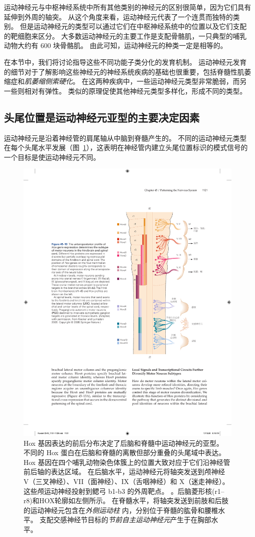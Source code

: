 运动神经元与中枢神经系统中所有其他类别的神经元的区别很简单，因为它们具有延伸到外周的轴突。
从这个角度来看，运动神经元代表了一个连贯而独特的类别。
但是运动神经元的类型可以通过它们在中枢神经系统中的位置以及它们支配的靶细胞来区分。
大多数运动神经元的主要工作是支配骨骼肌，一只典型的哺乳动物大约有 600 块骨骼肌。
由此可知，运动神经元的种类一定是相等的。


在本节中，我们将讨论指导这些不同功能子类分化的发育机制。
运动神经元发育的细节对于了解影响这些神经元的神经系统疾病的基础也很重要，包括脊髓性肌萎缩症和\textit{肌萎缩侧索硬化}。
在这两种疾病中，一些运动神经元类型非常脆弱，而另一些则相对有弹性。
类似的原理促使其他神经元类型多样化，形成不同的类型。



\subsection{头尾位置是运动神经元亚型的主要决定因素}

运动神经元是沿着神经管的肩尾轴从中脑到脊髓产生的。
不同的运动神经元类型在每个头尾水平发展（图~\ref{fig:45_10}），这表明在神经管内建立头尾位置标识的模式信号的一个目标是使运动神经元不同。


\begin{figure}[htbp]
	\centering
	\includegraphics[width=0.71\linewidth]{chap45/fig_45_10}
	\caption{Hox 基因表达的前后分布决定了后脑和脊髓中运动神经元的亚型。
		不同的 Hox 蛋白在后脑和脊髓的离散但部分重叠的头尾域中表达。
		Hox 基因在四个哺乳动物染色体簇上的位置大致对应于它们沿神经管前后轴的表达区域。
		在后脑水平，运动神经元将轴突发送到颅神经 V（三叉神经）、VII（面神经）、IX（舌咽神经）和 X（迷走神经）。
		这些颅运动神经投射到鳃弓 b1-b3 的外周靶点。
		。后脑菱形核(r1–r8)和HOX轮廓如左侧所示。
		在脊髓水平，将轴突发送到前肢和后肢的运动神经元包含在\textit{外侧运动柱} 内，分别位于脊髓的肱骨和腰椎水平。
		支配交感神经节目标的\textit{节前自主运动神经元}产生于在胸部水平\cite{kiecker2005compartments}。 }
	\label{fig:45_10}
\end{figure}


